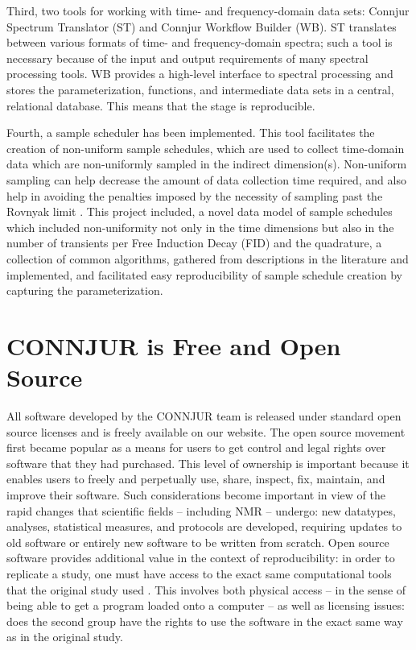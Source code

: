 Third, two tools for working with time- and frequency-domain data sets:  
Connjur Spectrum Translator (ST) and Connjur Workflow Builder (WB).  ST 
translates between various formats of time- and frequency-domain spectra; 
such a tool is necessary because of the input and output requirements of 
many spectral processing tools.  WB provides a high-level interface to 
spectral processing and stores the parameterization, functions, and 
intermediate data sets in a central, relational database.  This means 
that the stage is reproducible.

Fourth, a sample scheduler has been implemented.  This tool facilitates the 
creation of non-uniform sample schedules, which are used to collect time-domain 
data which are non-uniformly sampled in the indirect dimension(s).  Non-uniform 
sampling can help decrease the amount of data collection time required, and 
also help in avoiding the penalties imposed by the necessity of sampling past 
the Rovnyak limit \cite{rovnyak2004accelerated}.  This project included,
a novel data model of sample schedules which included non-uniformity not 
only in the time dimensions but also in the number of transients per 
Free Induction Decay (FID) and the quadrature, a collection of common 
algorithms, gathered from descriptions in the literature and implemented,
and facilitated easy reproducibility of sample schedule creation by capturing
the parameterization.


\section{CONNJUR is Free and Open Source}
All software developed by the CONNJUR team is released under standard open 
source licenses and is freely available on our website.  The open source 
movement first became popular as a means for users to get control and legal 
rights over software that they had purchased.  This level of ownership is 
important because it enables users to freely and perpetually use, share, 
inspect, fix, maintain, and improve their software.  Such considerations 
become important in view of the rapid changes that scientific fields -- 
including NMR -- undergo: new datatypes, analyses, statistical measures, 
and protocols are developed, requiring updates to old software or entirely 
new software to be written from scratch.  Open source software provides 
additional value in the context of reproducibility: in order to replicate a
study, one must have access to the exact same computational tools that the 
original study used \cite{ince2012open}.  
This involves both physical access -- in the sense of 
being able to get a program loaded onto a computer -- as well as licensing 
issues: does the second group have the rights to use the software in the 
exact same way as in the original study.

